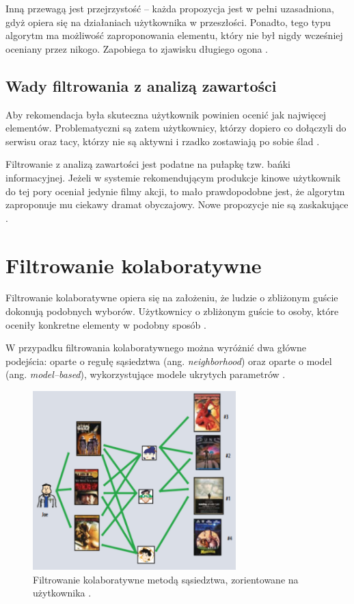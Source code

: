 \documentclass[twoside]{iisthesis}
\begin{document}
	 Inną przewagą jest przejrzystość -- każda propozycja jest w pełni uzasadniona, gdyż opiera się na działaniach użytkownika w przeszłości. Ponadto, tego typu algorytm ma możliwość zaproponowania elementu, który nie był nigdy wcześniej oceniany przez nikogo. Zapobiega to zjawisku długiego ogona \cite{id:ContentBasedRecommenderSystemsState}.
	 
	 \subsection{Wady filtrowania z analizą zawartości}
	 Aby rekomendacja była skuteczna użytkownik powinien ocenić jak najwięcej elementów. Problematyczni są zatem użytkownicy, którzy dopiero co dołączyli do serwisu oraz tacy, którzy nie są aktywni i rzadko zostawiają po sobie ślad \cite{id:MaleszkaMianowskaNguyenmethod}.
	 
	 Filtrowanie z analizą zawartości jest podatne na pułapkę tzw. bańki informacyjnej. Jeżeli w systemie rekomendującym produkcje kinowe użytkownik do tej pory oceniał jedynie filmy akcji, to mało prawdopodobne jest, że algorytm zaproponuje mu ciekawy dramat obyczajowy. Nowe propozycje nie są zaskakujące \cite{id:ContentBasedRecommenderSystemsState}.
	 
	 \section{Filtrowanie kolaboratywne}
	 
	 Filtrowanie kolaboratywne opiera się na założeniu, że ludzie o zbliżonym guście dokonują podobnych wyborów. Użytkownicy o zbliżonym guście to osoby, które oceniły konkretne elementy w podobny sposób \cite{id:IntroductionToRecommenderSystemsHandbook, id:CollaborativeFilteringRecommenderSystems, id:huynh2012modeling}. 
	 
	 W przypadku filtrowania kolaboratywnego można wyróżnić dwa główne podejścia: oparte o regułę sąsiedztwa (ang. \textit{neighborhood}) oraz oparte o model (ang. \textit{model--based}), wykorzystujące modele ukrytych parametrów \cite{id:AdvancesInCollaborativeFiltering,koren2009matrix}. 
	 
	 \begin{figure}[!ht] 
	 	\centering
	 	\includegraphics[width=0.7\textwidth]{cf}
	 	\caption{Filtrowanie kolaboratywne metodą sąsiedztwa,  zorientowane na użytkownika \protect\cite{koren2009matrix}.}
	 	\label{fig:cf}
	 \end{figure}
	 
\end{document}
